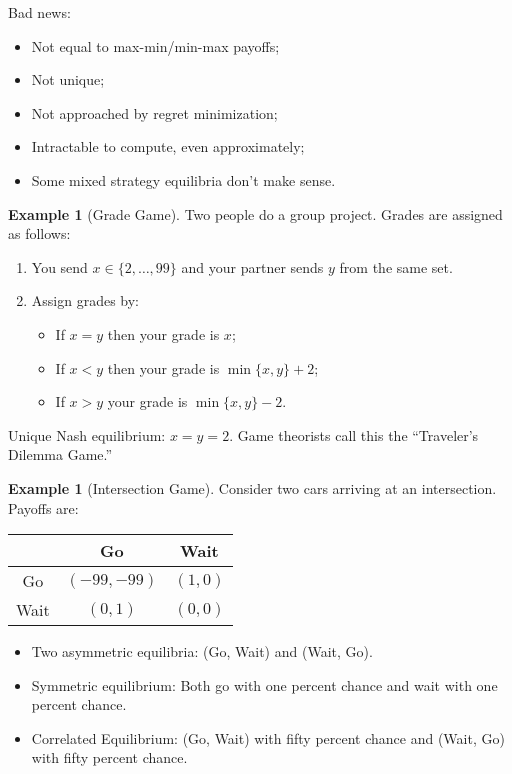 \documentclass[dvipsnames]{article}
\theoremstyle{definition}
\newtheorem{example}[definition]{Example}
\theoremstyle{remark}
\begin{document}
Bad news:
\begin{itemize}
	\item Not equal to max-min/min-max payoffs;
	\item Not unique;
	\item Not approached by regret minimization;
	\item Intractable to compute, even approximately;
	\item Some mixed strategy equilibria don't make sense.
\end{itemize}

\begin{example}[Grade Game]
	Two people do a group project. Grades are assigned as follows:
	\begin{enumerate}
		\item You send $x \in \{2,\dots,99\}$ and your partner sends $y$ from the same set.
		\item Assign grades by:
		\begin{itemize}
			\item If $x = y$ then your grade is $x$;
			\item If $x < y$ then your grade is $\min \{x,y\}+2$;
			\item If $x > y$ your grade is $\min \{x,y\}-2$.
		\end{itemize}
	\end{enumerate}
	Unique Nash equilibrium: $x = y = 2$. Game theorists call this the ``Traveler's Dilemma Game.''
\end{example}

\begin{example}[Intersection Game]
	Consider two cars arriving at an intersection. Payoffs are:
	\begin{table}[h]\centering
		\begin{tabular}{c|c|c|}
			& Go & Wait \\ \hline
			Go & $(-99,-99)$ & $(1,0)$  \\ \hline
			Wait & $(0,1)$ & $(0,0)$ \\ \hline
		\end{tabular}
	\end{table}
\begin{itemize}
		\item Two asymmetric equilibria: (Go, Wait) and (Wait, Go).
		\item Symmetric equilibrium: Both go with one percent chance and wait with one percent chance. 
		\item Correlated Equilibrium: (Go, Wait) with fifty percent chance and (Wait, Go) with fifty percent chance.
\end{itemize}
\end{example}
\end{document}
